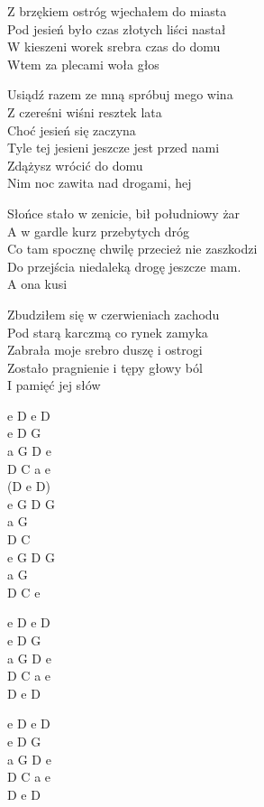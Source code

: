 \begin{text}
    Z brzękiem ostróg wjechałem do miasta\\
    Pod jesień było czas złotych liści nastał\\
    W kieszeni worek srebra czas do domu\\
    Wtem za plecami woła głos

    \vin Usiądź razem ze mną spróbuj mego wina\\
    \vin Z czereśni wiśni resztek lata\\
    \vin Choć jesień się zaczyna\\
    \vin Tyle tej jesieni jeszcze jest przed nami\\
    \vin Zdążysz wrócić do domu\\
    \vin Nim noc zawita nad drogami, hej

    Słońce stało w zenicie, bił południowy żar\\
    A w gardle kurz przebytych dróg\\
    Co tam spocznę chwilę przecież nie zaszkodzi\\
    Do przejścia niedaleką drogę jeszcze mam.\\
    A ona kusi

    Zbudziłem się w czerwieniach zachodu\\
    Pod starą karczmą co rynek zamyka\\
    Zabrała moje srebro duszę i ostrogi\\
    Zostało pragnienie i tępy głowy ból\\
    I pamięć jej słów
\end{text}
\begin{chord}
    e D e D\\
    e D G\\
    a G D e\\
    D C a e\\
    (D e D)\\
    e G D G\\
    a G\\
    D C\\
    e G D G\\
    a G\\
    D C e

    e D e D\\
    e D G\\
    a G D e\\
    D C a e\\
    D e D

    e D e D\\
    e D G\\
    a G D e\\
    D C a e\\
    D e D
\end{chord}